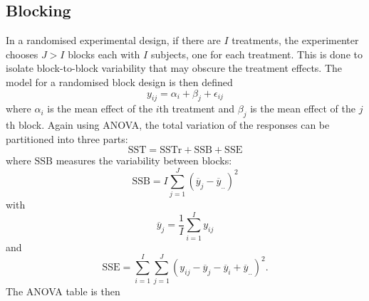 \documentclass{article}
\begin{document}
\subsection{Blocking}
In a randomised experimental design, if there are \(I\) treatments, the
experimenter chooses \(J > I\) blocks each with \(I\) subjects, one for
each treatment. This is done to isolate block-to-block variability that
may obscure the treatment effects. The model for a randomised block
design is then defined
\begin{equation*}
    y_{ij} = \alpha_i + \beta_j + \epsilon_{ij}
\end{equation*}
where \(\alpha_i\) is the mean effect of the \(i\)th treatment and
\(\beta_j\) is the mean effect of the \(j\)th block. Again using ANOVA, the total variation of the responses can be
partitioned into three parts:
\begin{equation*}
    \mathrm{SST} = \mathrm{SSTr} + \mathrm{SSB} + \mathrm{SSE}
\end{equation*}
where \(\mathrm{SSB}\) measures the variability between blocks:
\begin{equation*}
    \mathrm{SSB} = I \sum_{j = 1}^J \left( \overline{y}_j - \overline{y}_{..} \right)^2
\end{equation*}
with
\begin{equation*}
    \overline{y}_j = \frac{1}{I} \sum_{i = 1}^I y_{ij}
\end{equation*}
and
\begin{equation*}
    \mathrm{SSE} = \sum_{i = 1}^I \sum_{j = 1}^J \left( y_{ij} - \overline{y}_j - \overline{y}_i + \overline{y}_{..} \right)^2.
\end{equation*}
The ANOVA table is then
\end{document}
